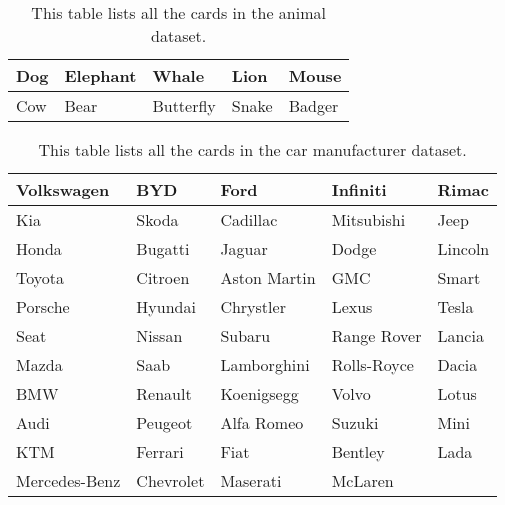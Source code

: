 \begin{table}[bp]
\centering
\begin{tabularx}
{\linewidth}{|X|X|X|X|X|}
\hline
Dog& Elephant  & Whale     & Lion& Mouse         \\
\hline
Cow       & Bear& Butterfly & Snake  & Badger    \\
\hline
\end{tabularx} 
\caption[Animal Dataset] 
{ 
This table lists all the cards in the animal dataset.
}
\label{tab:dataset-animal}
\end{table}

\begin{table}[bp]
\centering
\begin{tabularx}
{\linewidth}{|X|X|X|X|X|}
\hline
Volkswagen    & BYD      & Ford         & Infiniti    & Rimac   \\
\hline
Kia           & Skoda    & Cadillac     & Mitsubishi  & Jeep    \\
\hline
Honda         & Bugatti  & Jaguar       & Dodge       & Lincoln \\
\hline
Toyota        & Citroen  & Aston Martin & GMC         & Smart   \\
\hline
Porsche       & Hyundai  & Chrystler    & Lexus       & Tesla   \\
\hline
Seat          & Nissan   & Subaru       & Range Rover & Lancia  \\
\hline
Mazda         & Saab     & Lamborghini  & Rolls-Royce & Dacia   \\
\hline
BMW           & Renault  & Koenigsegg   & Volvo       & Lotus   \\
\hline
Audi          & Peugeot  & Alfa Romeo   & Suzuki      & Mini    \\
\hline
KTM           & Ferrari  & Fiat         & Bentley     & Lada    \\
\hline
Mercedes-Benz & Chevrolet& Maserati     & McLaren     &        \\
\hline
\end{tabularx} 
\caption[Car Dataset] 
{ 
This table lists all the cards in the car manufacturer dataset.
}
\label{tab:dataset-car}
\end{table}